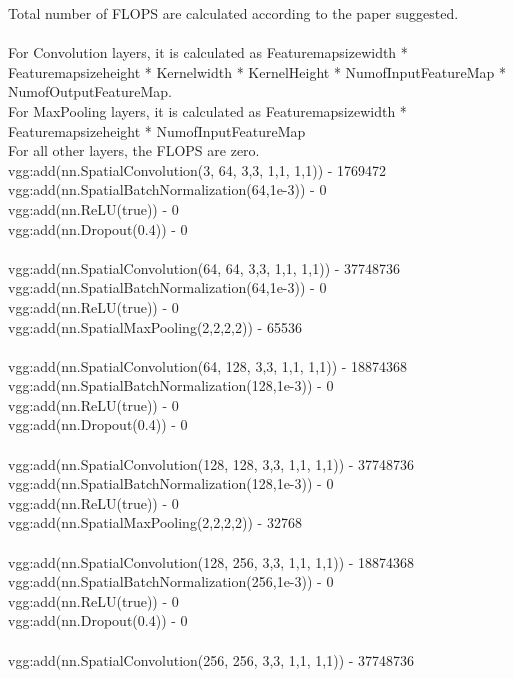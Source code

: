\documentclass[11pt]{article}
\begin{document}
Total number of FLOPS are calculated according to the paper suggested.\\\\
For Convolution layers, it is calculated as Featuremapsizewidth * Featuremapsizeheight * Kernelwidth * KernelHeight * NumofInputFeatureMap * NumofOutputFeatureMap. \\
For MaxPooling layers, it is calculated as Featuremapsizewidth * Featuremapsizeheight * NumofInputFeatureMap \\
For all other layers, the FLOPS are zero.\\
vgg:add(nn.SpatialConvolution(3, 64, 3,3, 1,1, 1,1)) - 1769472 \\ 
vgg:add(nn.SpatialBatchNormalization(64,1e-3))  - 0 \\ 
vgg:add(nn.ReLU(true)) - 0 \\
vgg:add(nn.Dropout(0.4)) - 0 \\
\\
vgg:add(nn.SpatialConvolution(64, 64, 3,3, 1,1, 1,1)) - 37748736 \\
vgg:add(nn.SpatialBatchNormalization(64,1e-3)) - 0\\
vgg:add(nn.ReLU(true)) - 0 \\
vgg:add(nn.SpatialMaxPooling(2,2,2,2)) - 65536 \\
\\
vgg:add(nn.SpatialConvolution(64, 128, 3,3, 1,1, 1,1)) - 18874368 \\
vgg:add(nn.SpatialBatchNormalization(128,1e-3)) - 0 \\
vgg:add(nn.ReLU(true)) - 0 \\
vgg:add(nn.Dropout(0.4)) - 0 \\
\\
vgg:add(nn.SpatialConvolution(128, 128, 3,3, 1,1, 1,1)) - 37748736 \\
vgg:add(nn.SpatialBatchNormalization(128,1e-3)) - 0\\
vgg:add(nn.ReLU(true)) - 0 \\
vgg:add(nn.SpatialMaxPooling(2,2,2,2)) - 32768 \\
\\
vgg:add(nn.SpatialConvolution(128, 256, 3,3, 1,1, 1,1)) - 18874368 \\
vgg:add(nn.SpatialBatchNormalization(256,1e-3)) - 0 \\
vgg:add(nn.ReLU(true)) - 0 \\
vgg:add(nn.Dropout(0.4)) - 0 \\
\\
vgg:add(nn.SpatialConvolution(256, 256, 3,3, 1,1, 1,1)) - 37748736 \\
\end{document}
